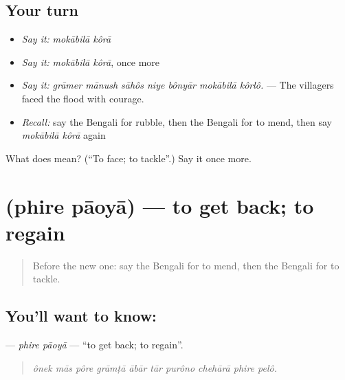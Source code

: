 \subsection*{Your turn}
\begin{itemize}
\raggedright
  \item \emph{Say it:} \emph{mokābilā kôrā}
  \item \emph{Say it:} \emph{mokābilā kôrā}, once more
  \item \emph{Say it:} \emph{grāmer mānush sāhôs niye bônyār mokābilā kôrlô.} — The villagers faced the flood with courage.
  \item \emph{Recall:} say the Bengali for rubble, then the Bengali for to mend, then say \emph{mokābilā kôrā} again
\end{itemize}

\begin{tcolorbox}[breakable,colback=teal!4,colframe=teal!35!black,title={Before you move on}]
What does   mean? (\textquotedblleft{}To face; to tackle\textquotedblright{}.) Say it once more.
\end{tcolorbox}
\section[\texorpdfstring{\bn{ফিরে} \bn{পাওয়া} (phire pāoyā)}{ফিরে পাওয়া (phire pāoyā)}]{  (phire pāoyā) — to get back; to regain}

\label{lesson:BN-C295-phire-paoya}



\begin{quote}
Before the new one: say the Bengali for to mend, then the Bengali for to tackle.
\end{quote}

\subsection*{You'll want to know:  }
\textbf{ } — \emph{phire pāoyā} — \textquotedblleft{}to get back; to regain\textquotedblright{}.

\begin{quote}
         
\end{quote}

\begin{quote}
\emph{ônek mās pôre grāmṭā ābār tār purôno chehārā phire pelô.}
\end{quote}

